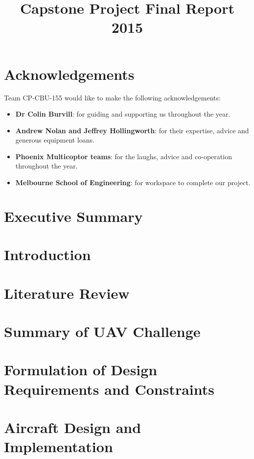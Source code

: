 \documentclass[]{article}
\title{Capstone Project
	  \vfill
	Final Report
	\vfill
	2015}
\author{}
\date{}
\begin{document}
	


\newpage

\section*{Acknowledgements}
Team CP-CBU-155 would like to make the following acknowledgements:
\begin{itemize}
	\item \textbf{Dr Colin Burvill}: for guiding and supporting us throughout the year.
	\item \textbf{Andrew Nolan and Jeffrey Hollingworth}: for their expertise, advice and generous equipment loans.
	\item \textbf{Phoenix Multicoptor teams}: for the laughs, advice and co-operation throughout the year.
	\item \textbf{Melbourne School of Engineering}: for workspace to complete our project.
\end{itemize}



\newpage
\section{Executive Summary}


\section{Introduction}


\section{Literature Review}


\section{Summary of UAV Challenge}


\section{Formulation of Design Requirements and Constraints}


\section{Aircraft Design and Implementation}

\end{document}
